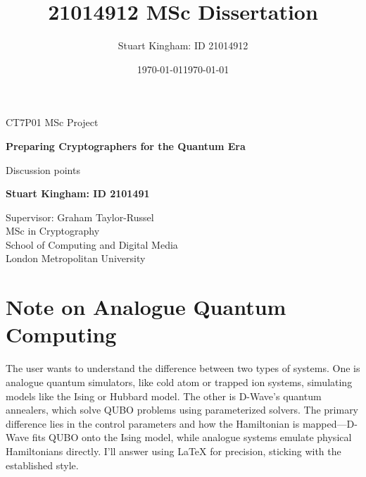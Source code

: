 \documentclass[11pt,a4paper]{article}
\author{Stuart Kingham: ID 21014912}
\title{21014912 MSc Dissertation}
\date{\today}
\begin{document}
	\doublespacing
	
	\begin{titlepage}
		\vspace*{\fill}
		\begin{center}
			\vspace*{1cm}
			
			{\LARGE CT7P01 MSc Project}
			
			
			\vspace*{1cm}
			{\large \textbf{Preparing Cryptographers for the Quantum Era}}
			
			\vspace{0.2cm}
			{\large Discussion points}
			
			
			\vfill
			
			\textbf{Stuart Kingham: ID 2101491}
			
			\vfill
			
			\vspace{0.8cm}
			
			
			Supervisor: Graham Taylor-Russel \\
			MSc in Cryptography \\
			School of Computing and Digital Media\\
			London Metropolitan University\\
			\date{\today}
			
		\end{center}
		\vspace*{\fill}
	\end{titlepage}
	
	\pagebreak
	
	
	\newpage
	
	\singlespacing 
	\tableofcontents
	\listoffigures
	\newpage
	
	\doublespacing

\section{Note on Analogue Quantum Computing}

The user wants to understand the difference between two types of systems. One is analogue quantum simulators, like cold atom or trapped ion systems, simulating models like the Ising or Hubbard model. The other is D-Wave's quantum annealers, which solve QUBO problems using parameterized solvers. The primary difference lies in the control parameters and how the Hamiltonian is mapped—D-Wave fits QUBO onto the Ising model, while analogue systems emulate physical Hamiltonians directly. I'll answer using LaTeX for precision, sticking with the established style.
\end{document}
